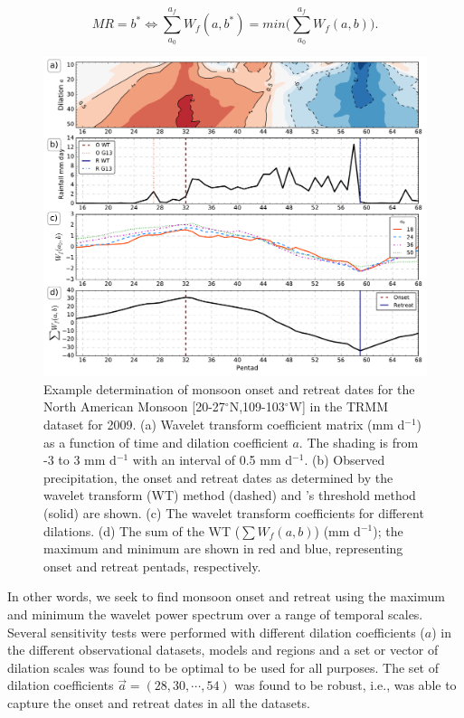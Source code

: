  \begin{equation}
MR=b^* \Leftrightarrow \sum_{a_0}^{a_f} W_f(a,b^*)=min\bigg(\sum_{a_0}^{a_f} W_f(a,b)\bigg).
\label{eq:mr}
\end{equation}

\begin{figure}[t!]
\centering
 \includegraphics[width=\linewidth]{figures/wav_fig3.pdf}
\caption[Example determination of onset and retreat in TRMM]{ Example determination of monsoon onset and retreat dates for the North American Monsoon [20-27$^\circ$N,109-103$^\circ$W] in the TRMM dataset for 2009.
(a) Wavelet transform coefficient matrix (mm d$^{-1}$) as a function of time and dilation coefficient $a$. The shading is from -3 to 3 mm d$^{-1}$  with an interval of 0.5 mm d$^{-1}$.
(b) Observed precipitation, the onset and retreat dates as determined by the wavelet transform (WT) method (dashed) and \cite{geil2013}'s threshold method (solid) are shown.
(c) The wavelet transform coefficients for different dilations. (d) The sum of the WT ($\sum W_f(a,b)$) (mm d$^{-1}$); the maximum and minimum are shown in red and blue, representing onset and retreat pentads, respectively.  }
\label{fig:wvt_3}
\end{figure}

In other words, we seek to find monsoon onset and retreat using the maximum and minimum the wavelet power spectrum over a range of temporal scales.
Several sensitivity tests were performed with different dilation coefficients ($a$) in the different observational datasets, models and regions and a set or vector of dilation scales was found to be optimal to be used for all purposes. 
The set of dilation coefficients $\vec{a} = (28,30,\cdots, 54)$ was found to be robust, i.e., was able to capture the onset and retreat dates in all the datasets.

